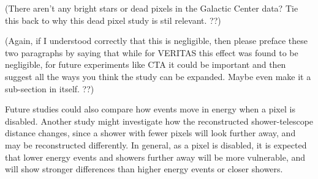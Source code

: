     {\color{red}(There aren't any bright stars or dead pixels in the Galactic Center data? Tie this back to why this dead pixel study is stil relevant. ??)}
    
    {\color{red}(Again, if I understood correctly that this is negligible, then please preface these two paragraphs by saying that while for VERITAS this effect was found to be negligible, for future experiments like CTA it could be important and then suggest all the ways you think the study can be expanded. Maybe even make it a sub-section in itself. ??)}

    Future studies could also compare how events move in energy when a pixel is disabled.
    Another study might investigate how the reconstructed shower-telescope distance changes, since a shower with fewer pixels will look further away, and may be reconstructed differently.
    In general, as a pixel is disabled, it is expected that lower energy events and showers further away will be more vulnerable, and will show stronger differences than higher energy events or closer showers.


